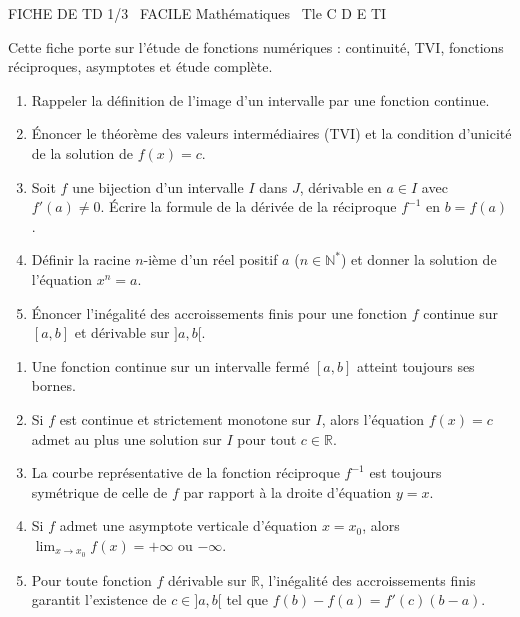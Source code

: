 \documentclass[11pt]{article}
\begin{document}
\begin{tcolorbox}[enhanced,colback=popink,colframe=popink,arc=10pt,boxrule=0pt,left=12pt,right=12pt,top=9pt,bottom=9pt]
{\color{white}\popxbold\small FICHE DE TD 1/3 \textbullet\ FACILE \hfill Mathématiques \textbullet\ Tle C D E TI\par}
\end{tcolorbox}
\vspace{4pt}
Cette fiche porte sur l'étude de fonctions numériques : continuité, TVI, fonctions réciproques, asymptotes et étude complète.

\begin{exercice}
\begin{enumerate}
    \item Rappeler la définition de l'image d'un intervalle par une fonction continue.
    \item Énoncer le théorème des valeurs intermédiaires (TVI) et la condition d'unicité de la solution de $f(x)=c$.
    \item Soit $f$ une bijection d'un intervalle $I$ dans $J$, dérivable en $a\in I$ avec $f'(a)\neq 0$. Écrire la formule de la dérivée de la réciproque $f^{-1}$ en $b=f(a)$.
    \item Définir la racine $n$-ième d'un réel positif $a$ ($n\in\mathbb{N}^*$) et donner la solution de l'équation $x^n=a$.
    \item Énoncer l'inégalité des accroissements finis pour une fonction $f$ continue sur $[a,b]$ et dérivable sur $]a,b[$.
\end{enumerate}
\end{exercice}

\begin{exercice}
\begin{enumerate}
    \item Une fonction continue sur un intervalle fermé $[a,b]$ atteint toujours ses bornes.
    \item Si $f$ est continue et strictement monotone sur $I$, alors l'équation $f(x)=c$ admet au plus une solution sur $I$ pour tout $c\in\mathbb{R}$.
    \item La courbe représentative de la fonction réciproque $f^{-1}$ est toujours symétrique de celle de $f$ par rapport à la droite d'équation $y=x$.
    \item Si $f$ admet une asymptote verticale d'équation $x=x_0$, alors $\lim_{x\to x_0}f(x)=+\infty$ ou $-\infty$.
    \item Pour toute fonction $f$ dérivable sur $\mathbb{R}$, l'inégalité des accroissements finis garantit l'existence de $c\in]a,b[$ tel que $f(b)-f(a)=f'(c)(b-a)$.
\end{enumerate}
\end{exercice}
\end{document}

